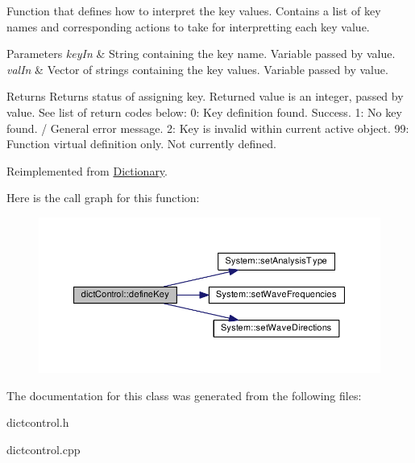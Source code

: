 Function that defines how to interpret the key values. Contains a list of key names and corresponding actions to take for interpretting each key value. 


\begin{DoxyParams}{Parameters}
{\em key\-In} & String containing the key name. Variable passed by value. \\
\hline
{\em val\-In} & Vector of strings containing the key values. Variable passed by value. \\
\hline
\end{DoxyParams}
\begin{DoxyReturn}{Returns}
Returns status of assigning key. Returned value is an integer, passed by value. See list of return codes below\-: 0\-: Key definition found. Success. 1\-: No key found. / General error message. 2\-: Key is invalid within current active object. 99\-: Function virtual definition only. Not currently defined. 
\end{DoxyReturn}


Reimplemented from \hyperlink{class_dictionary_ad80581bdcda172a72ab700c968ba56bc}{Dictionary}.



Here is the call graph for this function\-:\nopagebreak
\begin{figure}[H]
\begin{center}
\leavevmode
\includegraphics[width=350pt]{classdict_control_a8acd1846982a698adab13e790121b1ad_cgraph}
\end{center}
\end{figure}




The documentation for this class was generated from the following files\-:\begin{DoxyCompactItemize}
\item 
dictcontrol.\-h\item 
dictcontrol.\-cpp\end{DoxyCompactItemize}
